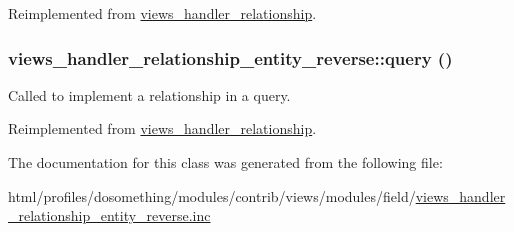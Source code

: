 Reimplemented from \hyperlink{classviews__handler__relationship_a33b2a40a9ddca4256d455137a28c4aa0}{views\_\-handler\_\-relationship}.\hypertarget{classviews__handler__relationship__entity__reverse_a312255f1150208b21b0ad32fb1412f1a}{
\subsubsection[{query}]{\setlength{\rightskip}{0pt plus 5cm}views\_\-handler\_\-relationship\_\-entity\_\-reverse::query ()}}
\label{classviews__handler__relationship__entity__reverse_a312255f1150208b21b0ad32fb1412f1a}
Called to implement a relationship in a query. 

Reimplemented from \hyperlink{classviews__handler__relationship_a7dc0b6371807dbf06efa594cb52b3348}{views\_\-handler\_\-relationship}.

The documentation for this class was generated from the following file:\begin{DoxyCompactItemize}
\item 
html/profiles/dosomething/modules/contrib/views/modules/field/\hyperlink{views__handler__relationship__entity__reverse_8inc}{views\_\-handler\_\-relationship\_\-entity\_\-reverse.inc}\end{DoxyCompactItemize}
